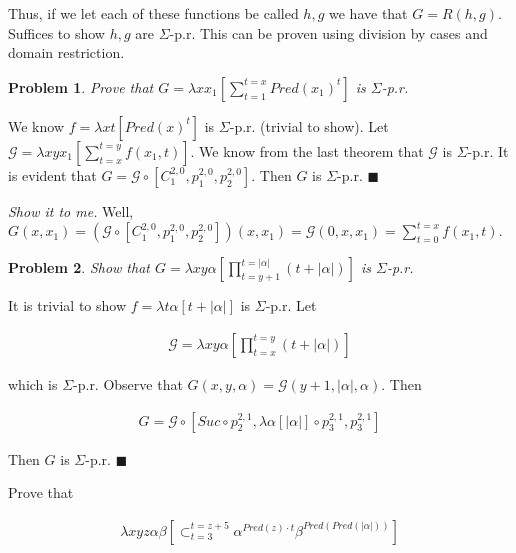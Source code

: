 \documentclass[a4paper, 12pt]{article}
\newtheorem{problem}{Problem}
\newtheorem{problem}{Problem}
\begin{document}
Thus, if we let each of these functions be called $h, g$ we have that $G = R(h,
g)$. Suffices to show $h, g$ are $\Sigma$-p.r. This can be proven using
division by cases and domain restriction.

\begin{problem}
    Prove that $G = \lambda x x_1 \left[ \sum_{t=1}^{t=x} Pred(x_1)^t \right] $ is
    $\Sigma$-p.r.
\end{problem}

We know $f = \lambda xt \left[ Pred(x)^t \right] $ is $\Sigma$-p.r. (trivial to
show). Let $\mathcal{G} = \lambda xy x_1 \left[ \sum_{t=x}^{t=y} f(x_1, t)
\right] $. We know from the last theorem that $\mathcal{G}$ is $\Sigma$-p.r. It
is evident that $G = \mathcal{G} \circ
\left[ C_1^{2, 0}, p_{1}^{2, 0}, p_{2}^{2, 0} \right] $. Then $G$ is
$\Sigma$-p.r. $\blacksquare$

\textit{Show it to me.} Well, $G(x, x_1) = \left( \mathcal{G} \circ \left[
C_{1}^{2, 0}, p_1^{2, 0}, p_2^{2, 0} \right]  \right)(x, x_1) = \mathcal{G}(0,
x, x_1) = \sum_{t=0}^{t=x} f(x_1, t)$.

\begin{problem}
    Show that $G = \lambda xy\alpha \left[ \prod_{t = y+1}^{t = |\alpha|} (t + |\alpha|)
    \right] $ is $\Sigma$-p.r.
\end{problem}

It is trivial to show $f = \lambda t\alpha \left[ t + |\alpha| \right] $ is
$\Sigma$-p.r. Let 

\begin{align*}
    \mathcal{G} = \lambda xy \alpha \left[ \prod_{t=x}^{t = y} (t + |\alpha|) \right] 
\end{align*}

which is $\Sigma$-p.r. Observe that $G(x, y, \alpha) = \mathcal{G}(y + 1,
|\alpha|,
\alpha)$. Then 

\begin{align*}
    G = \mathcal{G} \circ \left[ Suc \circ p_2^{2, 1}, \lambda \alpha[|\alpha|]
    \circ p_{3}^{2, 1}, p_3^{2, 1} \right]
\end{align*}

Then $G$ is $\Sigma$-p.r. $\blacksquare$

Prove that 

\begin{align*} \lambda xyz\alpha\beta \left[ \mathop{\subset}_{t=3}^{t=z+5}
    \alpha^{Pred(z) \cdot t} \beta^{Pred\left( Pred\left( |\alpha| \right)
\right) } \right] 
\end{align*}
\end{document}

